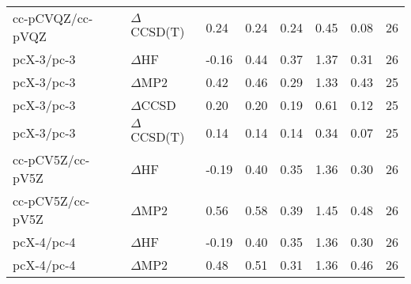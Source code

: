 \begin{table}
\begin{tabular}{l l l l l l l l }
    cc-pCVQZ/cc-pVQZ & $\Delta$CCSD(T) & 0.24 & 0.24 & 0.24 & 0.45 & 0.08 & 26 \\ 
    pcX-3/pc-3 & $\Delta$HF & -0.16 & 0.44 & 0.37 & 1.37 & 0.31 & 26 \\ 
    pcX-3/pc-3 & $\Delta$MP2 & 0.42 & 0.46 & 0.29 & 1.33 & 0.43 & 25 \\ 
    pcX-3/pc-3 & $\Delta$CCSD & 0.20 & 0.20 & 0.19 & 0.61 & 0.12 & 25 \\ 
    pcX-3/pc-3 & $\Delta$CCSD(T) & 0.14 & 0.14 & 0.14 & 0.34 & 0.07 & 25 \\ 
    cc-pCV5Z/cc-pV5Z & $\Delta$HF & -0.19 & 0.40 & 0.35 & 1.36 & 0.30 & 26 \\ 
    cc-pCV5Z/cc-pV5Z & $\Delta$MP2 & 0.56 & 0.58 & 0.39 & 1.45 & 0.48 & 26 \\ 
    pcX-4/pc-4 & $\Delta$HF & -0.19 & 0.40 & 0.35 & 1.36 & 0.30 & 26 \\ 
    pcX-4/pc-4 & $\Delta$MP2 & 0.48 & 0.51 & 0.31 & 1.36 & 0.46 & 26 \\ 
    \bottomrule
  \end{tabular}
\end{table}
